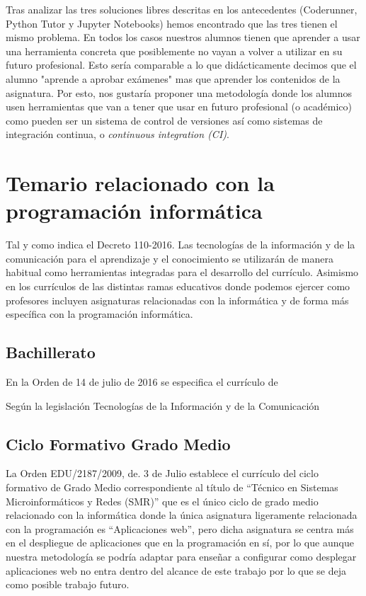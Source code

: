 Tras analizar las tres soluciones libres descritas en los antecedentes (Coderunner, Python Tutor y Jupyter Notebooks) hemos encontrado que las tres tienen el mismo problema. En todos los casos nuestros alumnos tienen que aprender a usar una herramienta concreta que posiblemente no vayan a volver a utilizar en su futuro profesional. Esto sería comparable a lo que didácticamente decimos que el alumno "aprende a aprobar exámenes" mas que aprender los contenidos de la asignatura. Por esto, nos gustaría proponer una metodología donde los alumnos usen herramientas que van a tener que usar en futuro profesional (o académico) como pueden ser un sistema de control de versiones así como sistemas de integración continua, o \textit{continuous integration (CI)}.

\section {Temario relacionado con la programación informática}

Tal y como indica el Decreto 110-2016. Las tecnologías de la información y de la comunicación para el aprendizaje y el conocimiento se utilizarán de manera habitual como herramientas integradas para el desarrollo del currículo. Asimismo en los currículos de las distintas ramas educativos donde podemos ejercer como profesores incluyen asignaturas relacionadas con la informática y de forma más específica con la programación informática.

\subsection {Bachillerato}

En la Orden de 14 de julio de 2016 se especifica el currículo de

Según la legislación Tecnologías de la Información y de la Comunicación

\subsection {Ciclo Formativo Grado Medio}

La Orden EDU/2187/2009, de. 3 de Julio establece el currículo del ciclo formativo de Grado Medio correspondiente al título de ``Técnico en Sistemas Microinformáticos y Redes (SMR)'' que es el único ciclo de grado medio relacionado con la informática donde la única asignatura ligeramente relacionada con la programación es ``Aplicaciones web'', pero dicha asignatura se centra más en el despliegue de aplicaciones que en la programación en sí, por lo que aunque nuestra metodología se podría adaptar para enseñar a configurar como desplegar aplicaciones web no entra dentro del alcance de este trabajo por lo que se deja como posible trabajo futuro.

